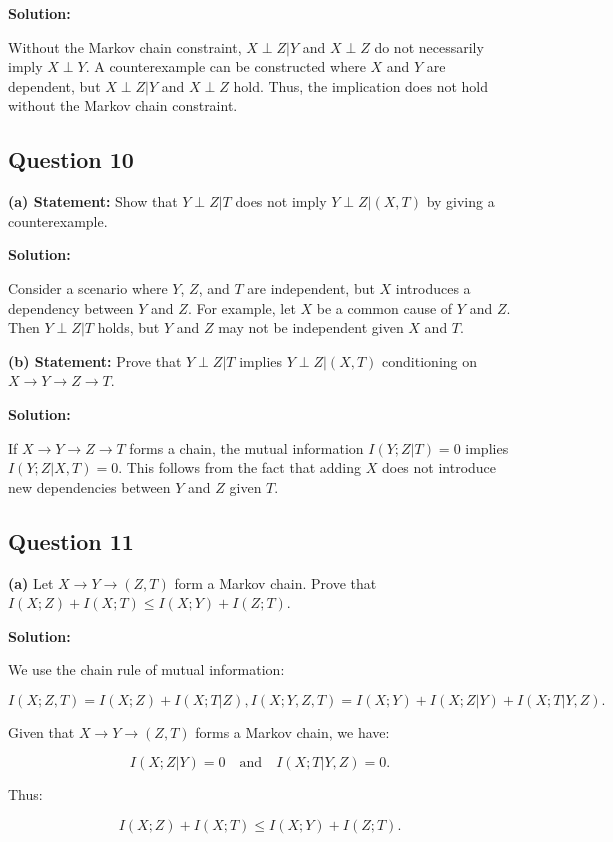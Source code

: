 \documentclass[a4paper,10pt]{article}
\begin{document}
\textbf{Solution:}

Without the Markov chain constraint, $ X \perp Z | Y $ and $ X \perp Z $ do not necessarily imply $ X \perp Y $. A counterexample can be constructed where $ X $ and $ Y $ are dependent, but $ X \perp Z | Y $ and $ X \perp Z $ hold. Thus, the implication does not hold without the Markov chain constraint.

\subsection*{Question 10}
\textbf{(a) Statement:} Show that $ Y \perp Z | T $ does not imply $ Y \perp Z | (X,T) $ by giving a counterexample.

\textbf{Solution:}

Consider a scenario where $ Y $, $ Z $, and $ T $ are independent, but $ X $ introduces a dependency between $ Y $ and $ Z $. For example, let $ X $ be a common cause of $ Y $ and $ Z $. Then $ Y \perp Z | T $ holds, but $ Y $ and $ Z $ may not be independent given $ X $ and $ T $.

\textbf{(b) Statement:} Prove that $ Y \perp Z | T $ implies $ Y \perp Z | (X,T) $ conditioning on $ X \to Y \to Z \to T $.

\textbf{Solution:}

If $ X \to Y \to Z \to T $ forms a chain, the mutual information $ I(Y; Z | T) = 0 $ implies $ I(Y; Z | X, T) = 0 $. This follows from the fact that adding $ X $ does not introduce new dependencies between $ Y $ and $ Z $ given $ T $.

\subsection*{Question 11}
\textbf{(a)} Let $ X \to Y \to (Z,T) $ form a Markov chain. Prove that $ I(X; Z) + I(X; T) \leq I(X; Y) + I(Z; T) $.

\textbf{Solution:}

We use the chain rule of mutual information:

$$
I(X; Z, T) = I(X; Z) + I(X; T | Z),
I(X; Y, Z, T) = I(X; Y) + I(X; Z | Y) + I(X; T | Y, Z).
$$

Given that $ X \to Y \to (Z,T) $ forms a Markov chain, we have:

$$
I(X; Z | Y) = 0 \quad \text{and} \quad I(X; T | Y, Z) = 0.
$$

Thus:

$$
I(X; Z) + I(X; T) \leq I(X; Y) + I(Z; T).
$$
\end{document}
